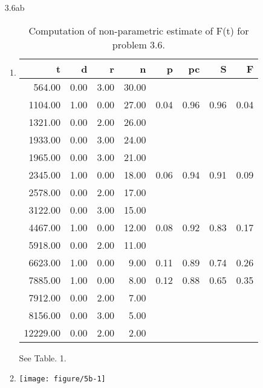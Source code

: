\documentclass[12pt]{article}\usepackage[]{graphicx}\usepackage[]{color}
\newenvironment{knitrout}{}{} %
\begin{document}
\begin{enumerate}
\item[3.6ab]
\begin{enumerate}
  \item
\begin{table}[ht]
\centering
\begin{tabular}{rrrrrrrr}
  \hline
t & d & r & n & p & pc & S & F \\ 
  \hline
564.00 & 0.00 & 3.00 & 30.00 &  &  &  &  \\ 
  1104.00 & 1.00 & 0.00 & 27.00 & 0.04 & 0.96 & 0.96 & 0.04 \\ 
  1321.00 & 0.00 & 2.00 & 26.00 &  &  &  &  \\ 
  1933.00 & 0.00 & 3.00 & 24.00 &  &  &  &  \\ 
  1965.00 & 0.00 & 3.00 & 21.00 &  &  &  &  \\ 
  2345.00 & 1.00 & 0.00 & 18.00 & 0.06 & 0.94 & 0.91 & 0.09 \\ 
  2578.00 & 0.00 & 2.00 & 17.00 &  &  &  &  \\ 
  3122.00 & 0.00 & 3.00 & 15.00 &  &  &  &  \\ 
  4467.00 & 1.00 & 0.00 & 12.00 & 0.08 & 0.92 & 0.83 & 0.17 \\ 
  5918.00 & 0.00 & 2.00 & 11.00 &  &  &  &  \\ 
  6623.00 & 1.00 & 0.00 & 9.00 & 0.11 & 0.89 & 0.74 & 0.26 \\ 
  7885.00 & 1.00 & 0.00 & 8.00 & 0.12 & 0.88 & 0.65 & 0.35 \\ 
  7912.00 & 0.00 & 2.00 & 7.00 &  &  &  &  \\ 
  8156.00 & 0.00 & 3.00 & 5.00 &  &  &  &  \\ 
  12229.00 & 0.00 & 2.00 & 2.00 &  &  &  &  \\ 
   \hline
\end{tabular}
\caption{Computation of non-parametric estimate of F(t) for problem 3.6.} 
\end{table}

 See Table. 1.
  \item
\begin{knitrout}
\color{fgcolor}
\texttt{[image: figure/5b-1]} 

\end{knitrout}
\end{enumerate}


\end{enumerate}
\end{document}
